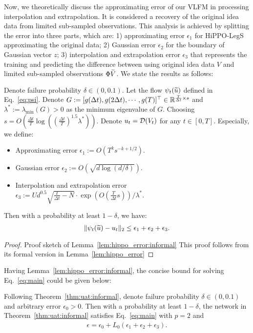 Now, we theoretically discuss the approximating error of our VLFM in processing interpolation and extrapolation. It is considered a recovery of the original idea data from limited sub-sampled observations. This analysis is achieved by splitting the error into three parts, which are: 1) approximating error $\epsilon_1$ for HiPPO-LegS approximating the original data; 2) Gaussian error $\epsilon_2$ for the boundary of Gaussian vector $z$; 3) interpolation and extrapolation error $\epsilon_3$ that represents the training and predicting the difference between using original idea data $V$ and limited sub-sampled observations $\Phi \widetilde{V}$. We state the results as follows:
\begin{lemma}\label{lem:hippo_error:informal}
    Denote failure probability $\delta \in (0, 0.1)$. Let the flow $\psi_t( \widetilde{u} )$ defined in Eq.~\eqref{eq:psi}. Denote $G := [g(\Delta t), g(2 \Delta t), \cdots, g(T)]^\top \in \mathbb{R}^{\frac{T}{\Delta t} \times s}$ and $\lambda^* := \lambda_{\min}(G) > 0$ as the minimum eigenvalue of $G$. Choosing $s = O(\frac{\Delta t}{T}\log((\frac{\Delta t}{T})^{1.5}\lambda^*))$. Denote $u_t = {\cal D}( V_{t} )$ for any $t \in [0, T]$. Especially, we define:
    \begin{itemize}
        \item Approximating error $\epsilon_1 := O(T^{k} s^{-k+1/2})$.
        \item Gaussian error $\epsilon_2 := O(\sqrt{d\log(d/\delta)})$.
        \item Interpolation and extrapolation error $\epsilon_3 := U d^{0.5} \sqrt{\frac{T}{\Delta t} - N} \cdot \exp(O(\frac{T}{\Delta t}s)) / \lambda^*$.
    \end{itemize}
    Then with a probability at least $1 - \delta$, we have:
    \begin{align*}
        \| \psi_t( \widetilde{u} ) - u_t \|_2 \leq \epsilon_1 + \epsilon_2 + \epsilon_3.
    \end{align*}
\end{lemma}

\begin{proof}{Proof sketch of Lemma~\ref{lem:hippo_error:informal}}
    This proof follows from its formal version in Lemma~\ref{lem:hippo_error}
\end{proof}

Having Lemma~\ref{lem:hippo_error:informal}, the concise bound for solving Eq.~\eqref{eq:main} could be given below:
\begin{theorem}\label{thm:inter_extra_polation:informal}
    Following Theorem~\ref{thm:uat:informal}, denote failure probability $\delta \in (0, 0.1)$ and arbitrary error $\epsilon_0 > 0$. Then with a probability at least $1 - \delta$, the network in Theorem~\ref{thm:uat:informal} satisfies Eq.~\eqref{eq:main} with $p = 2$ and
    \begin{align*}
        \epsilon = \epsilon_0 + L_0(\epsilon_1 + \epsilon_2 + \epsilon_3).
    \end{align*}
\end{theorem}


